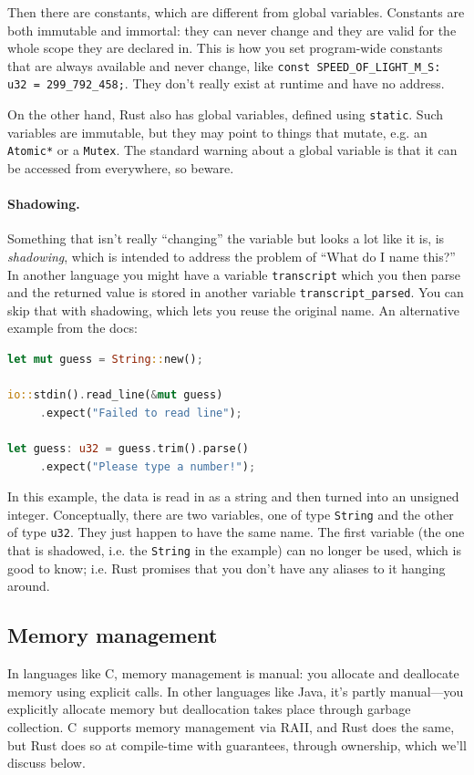 \documentclass[a4paper]{report}
\newcommand{\CPP}{C\nolinebreak\hspace{-.05em}\raisebox{.4ex}{\tiny\bf +}\nolinebreak\hspace{-.10em}\raisebox{.4ex}{\tiny\bf +}}
\def\CPP{{C\nolinebreak[4]\hspace{-.05em}\raisebox{.4ex}{\tiny\bf ++}}}
\begin{document}
Then there are constants, which are different from global variables. Constants are both immutable and immortal: they can never change and they are valid for the whole scope they are declared in. This is how you set program-wide constants that are always available and never change, like \texttt{const SPEED\_OF\_LIGHT\_M\_S: u32 = 299\_792\_458;}. They don't really exist at runtime and have no address.

On the other hand, Rust also has global variables, defined using \texttt{static}. Such variables are immutable, but they may point to things that mutate, e.g. an \texttt{Atomic*} or a \texttt{Mutex}. The standard warning about a global variable is that it can be accessed from everywhere, so beware.

\paragraph{Shadowing.}
Something that isn't really ``changing'' the variable but looks a lot like it is, is \textit{shadowing}, which is intended to address the problem of ``What do I name this?'' In another language you might have a variable \texttt{transcript} which you then parse and the returned value is stored in another variable \texttt{transcript\_parsed}. You can skip that with shadowing, which lets you reuse the original name. An alternative example from the docs:

\begin{lstlisting}[language=Rust]
let mut guess = String::new();

io::stdin().read_line(&mut guess)
     .expect("Failed to read line");

let guess: u32 = guess.trim().parse()
     .expect("Please type a number!");
\end{lstlisting}

In this example, the data is read in as a string and then turned into an unsigned integer. Conceptually, there are two variables, one of type \texttt{String} and the other of type \texttt{u32}. They just happen to have the same name. The first variable (the one that is shadowed, i.e. the \texttt{String} in the example) can no longer be used, which is good to know; i.e. Rust promises that you don't have any aliases to it hanging around.

\subsection*{Memory management}
In languages like C, memory management is manual: you allocate and deallocate memory using explicit calls. In other languages like Java, it's partly manual---you explicitly allocate memory but deallocation takes place through garbage collection. \CPP~supports memory management via RAII, and Rust does the same, but Rust does so at compile-time with guarantees, through ownership, which we'll discuss below.
\end{document}
